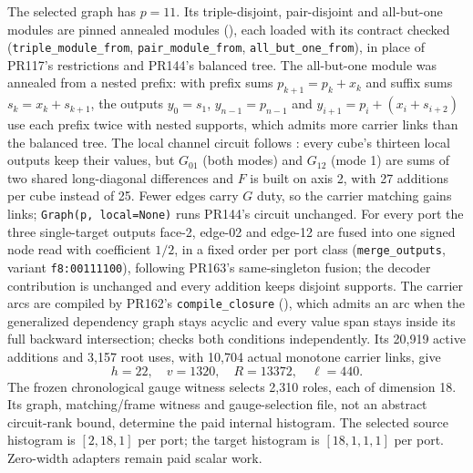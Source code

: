 The selected graph has $p=11$. Its triple-disjoint, pair-disjoint and
all-but-one modules are pinned annealed modules
(), each loaded with its contract checked
(\texttt{triple\_module\_from}, \texttt{pair\_module\_from},
\texttt{all\_but\_one\_from}), in place of PR117's restrictions and PR144's
balanced tree. The all-but-one module was annealed from a nested prefix: with
prefix sums $p_{k+1}=p_k+x_k$ and suffix sums $s_k=x_k+s_{k+1}$, the outputs
$y_0=s_1$, $y_{n-1}=p_{n-1}$ and $y_{i+1}=p_i+(x_i+s_{i+2})$ use each prefix
twice with nested supports, which admits more carrier links than the
balanced tree.
The local channel circuit follows :
every cube's thirteen local outputs keep their values, but $G_{01}$ (both
modes) and $G_{12}$ (mode 1) are sums of two shared long-diagonal
differences and $F$ is built on axis 2, with 27 additions per cube instead
of 25. Fewer edges carry $G$ duty, so the carrier matching gains links;
\texttt{Graph(p, local=None)} runs PR144's circuit unchanged.
For every port the three single-target outputs face-2, edge-02 and edge-12
are fused into one signed node read with coefficient $1/2$, in a fixed
order per port class (\texttt{merge\_outputs}, variant
\texttt{f8:00111100}), following PR163's same-singleton fusion; the decoder
contribution is unchanged and every addition keeps disjoint supports.
The carrier arcs are compiled by PR162's \texttt{compile\_closure}
(), which admits an arc when the
generalized dependency graph stays acyclic and every value span stays inside
its full backward intersection;  checks
both conditions independently.
Its 20,919 active additions and 3,157 root uses, with 10,704 actual
monotone carrier links, give
\[
 h=22,\quad v=1320,\quad R=13372,\quad\ell=440.
\]
The frozen chronological gauge witness selects 2,310 roles, each of
dimension 18. Its graph, matching/frame witness and gauge-selection file,
not an abstract circuit-rank bound, determine the paid internal histogram.
The selected source histogram is $[2,18,1]$ per port; the target histogram
is $[18,1,1,1]$ per port. Zero-width adapters remain paid scalar work.
